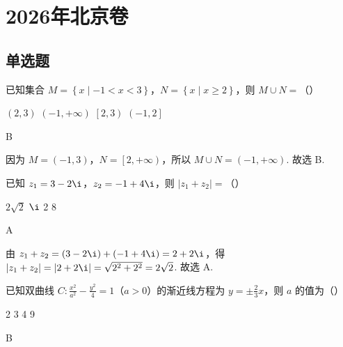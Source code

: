 \chapter{2026年北京卷}

\section{单选题}

\begin{problem}
已知集合 \( M=\left\{ x\mid -1<x<3 \right\} \)，\( N=\left\{ x\mid x\ge 2 \right\} \)，则 \( M\cup N=\)（\quad）

\choices
    {\( \left( 2,3 \right) \)}
    {\( \left( -1,+\infty \right) \)}
    {\( \left[ 2,3 \right) \)}
    {\( \left( -1,2 \right] \)}
\end{problem}

\begin{answer}
B
\end{answer}

\begin{solution}
因为 \( M=\left( -1,3 \right) \)，\( N=\left[ 2,+\infty \right) \)，所以 \( M\cup N=\left( -1,+\infty \right) \). 故选 B.
\end{solution}

\begin{problem}
已知 \( z_1=3-2\i \)，\( z_2=-1+4\i \)，则 \( \left| z_1+z_2 \right|=\)（\quad）

\choices
    {\( 2\sqrt{2} \)}
    {\( \i \)}
    {2}
    {8}
\end{problem}

\begin{answer}
A
\end{answer}

\begin{solution}
由 \( z_1+z_2=\left( 3-2\i \right)+\left( -1+4\i \right)=2+2\i \)，得 \( \left| z_1+z_2 \right|=\left| 2+2\i \right|=\sqrt{2^2+2^2}=2\sqrt{2} \). 故选 A.
\end{solution}

\begin{problem}
已知双曲线 \( C:\frac{x^2}{a^2}-\frac{y^2}{4}=1 \)（\( a>0 \)）的渐近线方程为 \( y=\pm \frac{2}{3}x \)，则 \( a \) 的值为（\quad）

\choices
    {2}
    {3}
    {4}
    {9}
\end{problem}

\begin{answer}
B
\end{answer}

